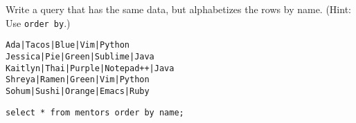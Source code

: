 \begin{blocksection}
\question Write a query that has the same data, but alphabetizes the rows by name. (Hint: Use \lstinline$order by$.)

\begin{lstlisting}
Ada|Tacos|Blue|Vim|Python
Jessica|Pie|Green|Sublime|Java
Kaitlyn|Thai|Purple|Notepad++|Java
Shreya|Ramen|Green|Vim|Python
Sohum|Sushi|Orange|Emacs|Ruby
\end{lstlisting}

\begin{solution}[1in]
\begin{lstlisting}
select * from mentors order by name;
\end{lstlisting}
\end{solution}
\end{blocksection}
